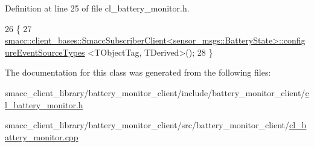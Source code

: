 Definition at line 25 of file cl\+\_\+battery\+\_\+monitor.\+h.


\begin{DoxyCode}
26     \{
27         
      \hyperlink{classsmacc_1_1client__bases_1_1SmaccSubscriberClient}{smacc::client\_bases::SmaccSubscriberClient<sensor\_msgs::BatteryState>::configureEventSourceTypes}
      <TObjectTag, TDerived>();
28     \}
\end{DoxyCode}


The documentation for this class was generated from the following files\+:\begin{DoxyCompactItemize}
\item 
smacc\+\_\+client\+\_\+library/battery\+\_\+monitor\+\_\+client/include/battery\+\_\+monitor\+\_\+client/\hyperlink{cl__battery__monitor_8h}{cl\+\_\+battery\+\_\+monitor.\+h}\item 
smacc\+\_\+client\+\_\+library/battery\+\_\+monitor\+\_\+client/src/battery\+\_\+monitor\+\_\+client/\hyperlink{cl__battery__monitor_8cpp}{cl\+\_\+battery\+\_\+monitor.\+cpp}\end{DoxyCompactItemize}
